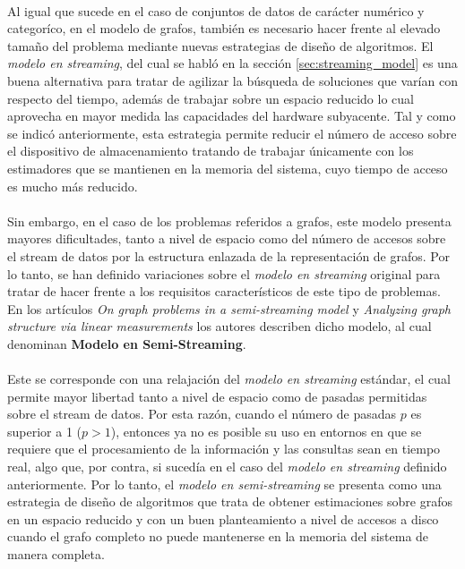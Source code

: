 \documentclass{subfiles}
\begin{document}
      \paragraph{}
      Al igual que sucede en el caso de conjuntos de datos de carácter numérico y categoríco, en el modelo de grafos, también es necesario hacer frente al elevado tamaño del problema mediante nuevas estrategias de diseño de algoritmos. El \emph{modelo en streaming}, del cual se habló en la sección \ref{sec:streaming_model} es una buena alternativa para tratar de agilizar la búsqueda de soluciones que varían con respecto del tiempo, además de trabajar sobre un espacio reducido lo cual aprovecha en mayor medida las capacidades del hardware subyacente. Tal y como se indicó anteriormente, esta estrategia permite reducir el número de acceso sobre el dispositivo de almacenamiento tratando de trabajar únicamente con los estimadores que se mantienen en la memoria del sistema, cuyo tiempo de acceso es mucho más reducido.

      \paragraph{}
      Sin embargo, en el caso de los problemas referidos a grafos, este modelo presenta mayores dificultades, tanto a nivel de espacio como del número de accesos sobre el stream de datos por la estructura enlazada de la representación de grafos. Por lo tanto, se han definido variaciones sobre el \emph{modelo en streaming} original para tratar de hacer frente a los requisitos característicos de este tipo de problemas. En los artículos \emph{On graph problems in a semi-streaming model} \cite{feigenbaum2005graph} y \emph{Analyzing graph structure via linear measurements} \cite{ahn2012analyzing} los autores describen dicho modelo, al cual denominan \textbf{Modelo en Semi-Streaming}.

      \paragraph{}
      Este se corresponde con una relajación del \emph{modelo en streaming} estándar, el cual permite mayor libertad tanto a nivel de espacio como de pasadas permitidas sobre el stream de datos. Por esta razón, cuando el número de pasadas $p$ es superior a 1 ($p > 1$), entonces ya no es posible su uso en entornos en que se requiere que el procesamiento de la información y las consultas sean en tiempo real, algo que, por contra, si sucedía en el caso del \emph{modelo en streaming} definido anteriormente. Por lo tanto, el \emph{modelo en semi-streaming} se presenta como una estrategia de diseño de algoritmos que trata de obtener estimaciones sobre grafos en un espacio reducido y con un buen planteamiento a nivel de accesos a disco cuando el grafo completo no puede mantenerse en la memoria del sistema de manera completa.
\end{document}
